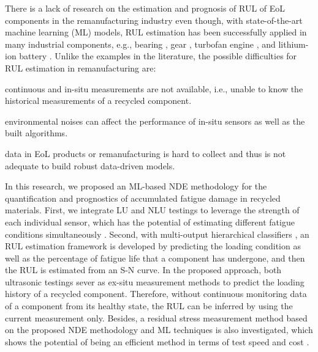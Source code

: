 There is a lack of research on the estimation and prognosis of RUL of EoL components in the remanufacturing industry even though, with state-of-the-art machine learning (ML) models, RUL estimation has been successfully applied in many industrial components, e.g., bearing \cite{rul-nn-bearing-BENALI2015150, rul-cnn-bearing-LI20181, rul-ensemble-bearing}, gear \cite{rul-review-gear}, turbofan engine \cite{rul-statespace-turbo-battery-Mosallam2016,rul-cnn-turbo-LI20181,rul-rnn-turbo-WU2020241}, and lithium-ion battery \cite{rul-statespace-turbo-battery-Mosallam2016,rul-review-battery-LIPU2018115,rul-gpr-battery-9040661}. Unlike the examples in the literature, the possible difficulties for RUL estimation in remanufacturing are: 
\begin{enumerate*}[label=(\alph*)]
    \item continuous and in-situ measurements are not available, i.e., unable to know the historical measurements of a recycled component.
    \item environmental noises can affect the performance of in-situ sensors as well as the built algorithms.
    \item data in EoL products or remanufacturing is hard to collect and thus is not adequate to build robust data-driven models.
\end{enumerate*}

In this research, we proposed an ML-based NDE methodology for the quantification and prognostics of accumulated fatigue damage in recycled materials. First, we integrate LU and NLU testings to leverage the strength of each individual sensor, which has the potential of estimating different fatigue conditions simultaneously \cite{nde-review-WISNER2020}. Second, with multi-output hierarchical classifiers \cite{hierarchical-Silla2011}, an RUL estimation framework is developed by predicting the loading condition as well as the percentage of fatigue life that a component has undergone, and then the RUL is estimated from an S-N curve. In the proposed approach, both ultrasonic testings sever as ex-situ measurement methods to predict the loading history of a recycled component. Therefore, without continuous monitoring data of a component from its healthy state, the RUL can be inferred by using the current measurement only. Besides, a residual stress measurement method based on the proposed NDE methodology and ML techniques is also investigated, which shows the potential of being an efficient method in terms of test speed and cost \cite{nde-lu-rs-TANALA199583}.

